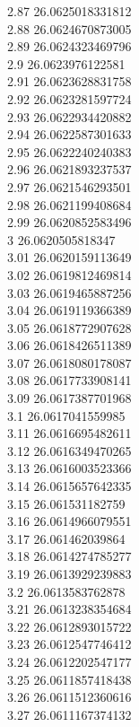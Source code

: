 {2.87	26.0625018331812\\
2.88	26.0624670873005\\
2.89	26.0624323469796\\
2.9	26.0623976122581\\
2.91	26.0623628831758\\
2.92	26.0623281597724\\
2.93	26.0622934420882\\
2.94	26.0622587301633\\
2.95	26.0622240240383\\
2.96	26.0621893237537\\
2.97	26.0621546293501\\
2.98	26.0621199408684\\
2.99	26.0620852583496\\
3	26.0620505818347\\
3.01	26.0620159113649\\
3.02	26.0619812469814\\
3.03	26.0619465887256\\
3.04	26.0619119366389\\
3.05	26.0618772907628\\
3.06	26.0618426511389\\
3.07	26.0618080178087\\
3.08	26.0617733908141\\
3.09	26.0617387701968\\
3.1	26.0617041559985\\
3.11	26.0616695482611\\
3.12	26.0616349470265\\
3.13	26.0616003523366\\
3.14	26.0615657642335\\
3.15	26.061531182759\\
3.16	26.0614966079551\\
3.17	26.061462039864\\
3.18	26.0614274785277\\
3.19	26.0613929239883\\
3.2	26.0613583762878\\
3.21	26.0613238354684\\
3.22	26.0612893015722\\
3.23	26.0612547746412\\
3.24	26.0612202547177\\
3.25	26.0611857418438\\
3.26	26.0611512360616\\
3.27	26.0611167374132\\
}
